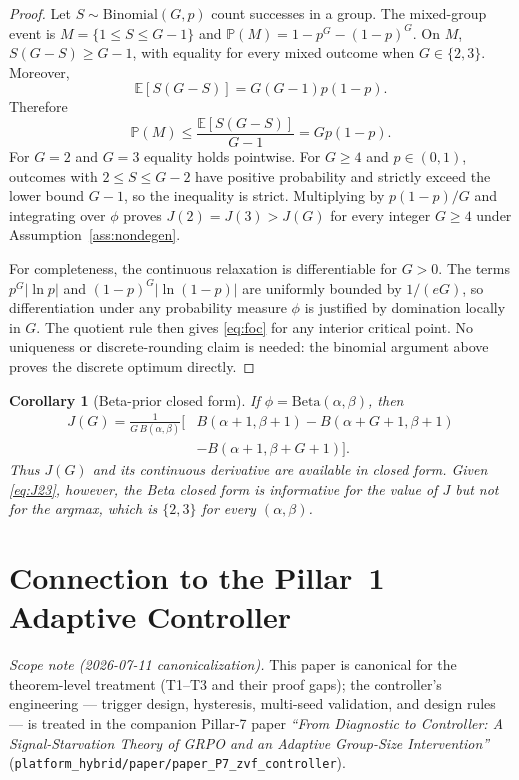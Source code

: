 \documentclass[11pt]{article}
\theoremstyle{plain}
\newtheorem{corollary}{Corollary}
\theoremstyle{definition}
\theoremstyle{remark}
\newcommand{\E}{\mathbb{E}}
\newcommand{\Prob}{\mathbb{P}}
\newcommand{\1}{\mathbb{1}}
\begin{document}
\begin{proof}
Let $S\sim\mathrm{Binomial}(G,p)$ count successes in a group. The mixed-group
event is $M=\{1\le S\le G-1\}$ and
$\Prob(M)=1-p^G-(1-p)^G$. On $M$,
$S(G-S)\ge G-1$, with equality for every mixed outcome when $G\in\{2,3\}$.
Moreover,
\[
\E[S(G-S)]=G(G-1)p(1-p).
\]
Therefore
\[
\Prob(M)\le\frac{\E[S(G-S)]}{G-1}=G p(1-p).
\]
For $G=2$ and $G=3$ equality holds pointwise. For $G\ge4$ and
$p\in(0,1)$, outcomes with $2\le S\le G-2$ have positive probability and
strictly exceed the lower bound $G-1$, so the inequality is strict. Multiplying
by $p(1-p)/G$ and integrating over $\phi$ proves
$J(2)=J(3)>J(G)$ for every integer $G\ge4$ under
Assumption~\ref{ass:nondegen}.

For completeness, the continuous relaxation is differentiable for $G>0$.
The terms $p^G|\ln p|$ and $(1-p)^G|\ln(1-p)|$ are uniformly bounded by
$1/(eG)$, so differentiation under any probability measure $\phi$ is justified
by domination locally in $G$. The quotient rule then gives \eqref{eq:foc} for
any interior critical point. No uniqueness or discrete-rounding claim is needed:
the binomial argument above proves the discrete optimum directly.
\end{proof}

\begin{corollary}[Beta-prior closed form]\label{cor:beta}
If $\phi=\mathrm{Beta}(\alpha,\beta)$, then
\begin{align}
J(G)=\frac{1}{G\,B(\alpha,\beta)}\big[&B(\alpha+1,\beta+1)
-B(\alpha+G+1,\beta+1)\nonumber\\
&-B(\alpha+1,\beta+G+1)\big].
\end{align}
Thus $J(G)$ and its continuous derivative are available in closed form.
Given \eqref{eq:J23}, however, the Beta closed form is informative for the
\emph{value} of $J$ but not for the argmax, which is $\{2,3\}$ for every
$(\alpha,\beta)$.
\end{corollary}

\section{Connection to the Pillar~1 Adaptive Controller}\label{sec:controller}
\noindent\emph{Scope note (2026-07-11 canonicalization).} This paper is
canonical for the theorem-level treatment (T1--T3 and their proof gaps);
the controller's engineering --- trigger design, hysteresis, multi-seed
validation, and design rules --- is treated in the companion Pillar-7
paper \emph{``From Diagnostic to Controller: A Signal-Starvation Theory of
GRPO and an Adaptive Group-Size Intervention''}
(\texttt{platform\_hybrid/paper/paper\_P7\_zvf\_controller}).
\end{document}

